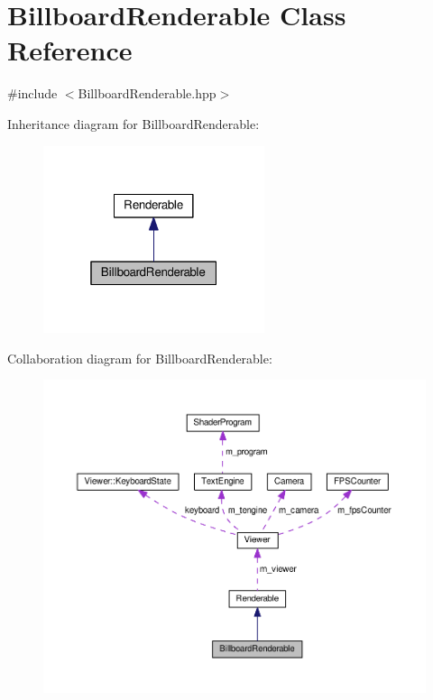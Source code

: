 \hypertarget{classBillboardRenderable}{\section{Billboard\+Renderable Class Reference}
\label{classBillboardRenderable}
}


{\ttfamily \#include $<$Billboard\+Renderable.\+hpp$>$}



Inheritance diagram for Billboard\+Renderable\+:\nopagebreak
\begin{figure}[H]
\begin{center}
\leavevmode
\includegraphics[width=184pt]{classBillboardRenderable__inherit__graph}
\end{center}
\end{figure}


Collaboration diagram for Billboard\+Renderable\+:\nopagebreak
\begin{figure}[H]
\begin{center}
\leavevmode
\includegraphics[width=350pt]{classBillboardRenderable__coll__graph}
\end{center}
\end{figure}
